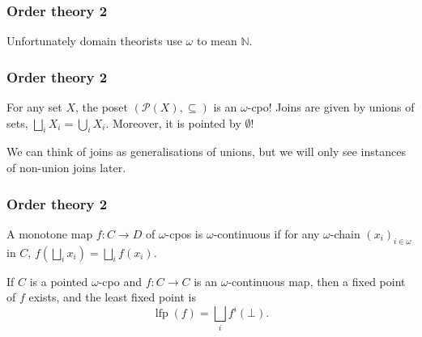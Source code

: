 \documentclass[usepdftitle=false]{beamer}
\newcommand{\NN}{\mathbb{N}}
\DeclareMathOperator{\lfp}{lfp}
\begin{document}
\begin{frame}
    \frametitle{Order theory 2}
    Unfortunately domain theorists use \(\omega\) to mean \(\NN\).

\end{frame}

\begin{frame}
    \frametitle{Order theory 2}
    \begin{example}
        For any set \(X\), the poset \((\mathcal{P}(X), \subseteq)\) is an \(\omega\)-cpo!
        Joins are given by unions of sets, \(\bigsqcup_i X_i = \bigcup_i X_i\).
        Moreover, it is pointed by \(\emptyset\)!
    \end{example}
    We can think of joins as generalisations of unions, but we will only see instances of non-union joins later.
\end{frame}

\begin{frame}
    \frametitle{Order theory 2}
    \begin{definition}
        A monotone map \(f : C \to D\) of \(\omega\)-cpos is \(\omega\)-continuous if for any \(\omega\)-chain \((x_i)_{i \in \omega}\) in \(C\), \(f(\bigsqcup_i x_i) = \bigsqcup_i f(x_i) \).
    \end{definition}
    \begin{theorem}
        If \(C\) is a pointed \(\omega\)-cpo and \(f : C \to C\) is an \(\omega\)-continuous map, then a fixed point of \(f\) exists, and the least fixed point is
        \[
            \lfp(f) = \bigsqcup_i f^i(\bot).
        \]
    \end{theorem}
\end{frame}
\end{document}
